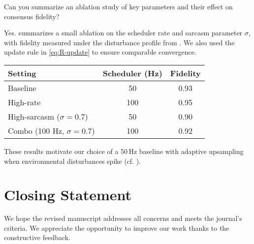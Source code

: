 \documentclass[a4paper,11pt]{article}
\begin{document}
\begin{question}[q:ablation]
Can you summarize an ablation study of key parameters and their effect on consensus fidelity?
\end{question}
\begin{answer}[a:ablation]
Yes.  summarizes a small ablation on the scheduler rate and sarcasm parameter $\sigma$, with fidelity measured under the disturbance profile from . We also used the update rule in \eqref{eq:R-update} to ensure comparable convergence.

\begin{center}
\begin{minipage}{0.9\linewidth}
    \centering
    \renewcommand{\arraystretch}{1.15}
    \begin{tabular}{lcc}
        \hline
        Setting & Scheduler (Hz) & Fidelity \\
        \hline
        Baseline & 50 & 0.93 \\
        High-rate & 100 & 0.95 \\
        High-sarcasm ($\sigma=0.7$) & 50 & 0.90 \\
        Combo (100 Hz, $\sigma=0.7$) & 100 & 0.92 \\
        \hline
    \end{tabular}
    \label{tab:R-ablation}
\end{minipage}
\end{center}

These results motivate our choice of a 50\,Hz baseline with adaptive upsampling when environmental disturbances spike (cf. ).
\end{answer}

\section*{Closing Statement}
We hope the revised manuscript addresses all concerns and meets the journal's criteria. We appreciate the opportunity to improve our work thanks to the constructive feedback.

\printbibliography
\end{document}
